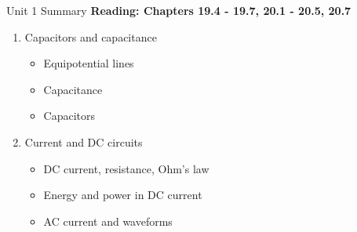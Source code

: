 \documentclass{beamer}
\begin{document}
\begin{frame}{Unit 1 Summary}
\textbf{Reading: Chapters 19.4 - 19.7, 20.1 - 20.5, 20.7}
\begin{enumerate}
\item Capacitors and capacitance
\begin{itemize}
\item Equipotential lines
\item Capacitance
\item Capacitors
\end{itemize}
\item Current and DC circuits
\begin{itemize}
\item DC current, resistance, Ohm's law
\item Energy and power in DC current
\item AC current and waveforms
\end{itemize}
\end{enumerate}
\end{frame}
\end{document}
